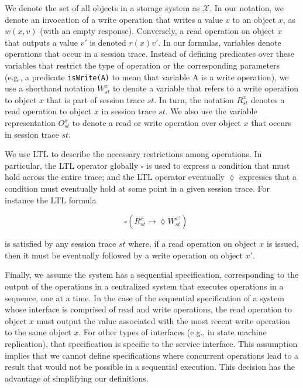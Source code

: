 \documentclass[conference]{IEEEtran}
\begin{document}
	We denote the set of all objects in a storage system as $\mathcal{X}$. In our notation, we denote an invocation of a write operation that writes a value $v$ to an object $x$, as $w(x,v)$ (with an empty response). Conversely, a read operation on object $x$ that outputs a value $v'$ is denoted $r(x){v'}$.
	In our formulas, variables denote operations that occur in a session trace.
	Instead of defining predicates over these variables that restrict the type of operation or the corresponding parameters (e.g., a predicate {\tt isWrite(A)} to mean that variable A is a write operation), we use a shorthand notation $W^{x}_{st}$ to denote a variable that refers to a write operation to object $x$ that is part of session trace $st$. In turn, the notation $R^{x}_{st}$ denotes a read operation to object $x$ in session trace $st$. We also use the variable representation $O^{x}_{st}$ to denote a read or write operation over object $x$ that occurs in session trace $st$.
	
	We use LTL to describe the necessary restrictions among operations. In particular, the LTL operator globally $\square$ is used to express a condition that must hold across the entire trace; and the LTL operator eventually $\lozenge$ expresses that a condition must eventually hold at some point in a given session trace.  For instance the LTL formula
	
	$$ \quad \square \left( R_\mathit{st}^x \rightarrow \lozenge W_\mathit{st}^{x'} \right) $$
	
	\noindent is satisfied by any session trace $st$ where, if a read operation on object $x$ is issued, then it must be eventually followed by a write operation on object $x'$.
	
	Finally, we assume the system has a sequential specification, %
	corresponding to the output of the operations in a centralized system that executes operations in a sequence, one at a time. In the case of the sequential specification of a system whose interface is comprised of read and write operations, the read operation to object $x$ must output the value associated with the most recent write operation to the same object $x$. For other types of interfaces (e.g., in state machine replication), that specification %
	is specific to the service interface. %
	This assumption implies that we cannot define specifications where concurrent operations lead to a result that would not be possible in a sequential execution. This decision has the advantage of simplifying our definitions.
	
\end{document}
